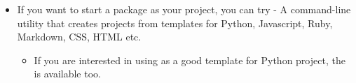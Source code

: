 \documentclass[letterpaper,10pt,english]{sphinxmanual}
\begin{document}
\begin{itemize}
\begin{itemize}
\end{itemize}

\item {} 
If you want to start a package as your project, you can try
 - A
command-line utility that creates projects from templates for Python,
Javascript, Ruby, Markdown, CSS, HTML etc.
\begin{itemize}
\item {} 
If you are interested in using  as a good template for
Python project, the  is
available too.

\end{itemize}

\end{itemize}
\end{document}
